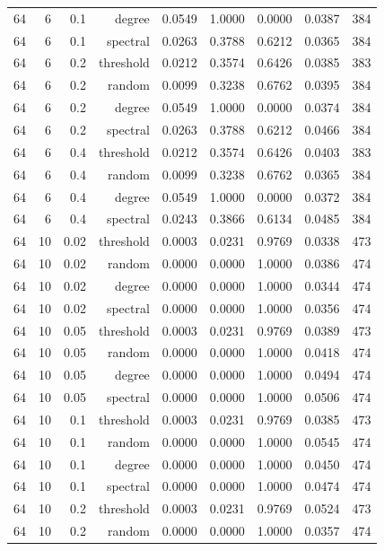 \begin{table}[t]
\begin{tabular}{lrrrrrrrr}
64 & 6 & 0.1 & degree & 0.0549 & 1.0000 & 0.0000 & 0.0387 & 384 \\
64 & 6 & 0.1 & spectral & 0.0263 & 0.3788 & 0.6212 & 0.0365 & 384 \\
64 & 6 & 0.2 & threshold & 0.0212 & 0.3574 & 0.6426 & 0.0385 & 383 \\
64 & 6 & 0.2 & random & 0.0099 & 0.3238 & 0.6762 & 0.0395 & 384 \\
64 & 6 & 0.2 & degree & 0.0549 & 1.0000 & 0.0000 & 0.0374 & 384 \\
64 & 6 & 0.2 & spectral & 0.0263 & 0.3788 & 0.6212 & 0.0466 & 384 \\
64 & 6 & 0.4 & threshold & 0.0212 & 0.3574 & 0.6426 & 0.0403 & 383 \\
64 & 6 & 0.4 & random & 0.0099 & 0.3238 & 0.6762 & 0.0365 & 384 \\
64 & 6 & 0.4 & degree & 0.0549 & 1.0000 & 0.0000 & 0.0372 & 384 \\
64 & 6 & 0.4 & spectral & 0.0243 & 0.3866 & 0.6134 & 0.0485 & 384 \\
64 & 10 & 0.02 & threshold & 0.0003 & 0.0231 & 0.9769 & 0.0338 & 473 \\
64 & 10 & 0.02 & random & 0.0000 & 0.0000 & 1.0000 & 0.0386 & 474 \\
64 & 10 & 0.02 & degree & 0.0000 & 0.0000 & 1.0000 & 0.0344 & 474 \\
64 & 10 & 0.02 & spectral & 0.0000 & 0.0000 & 1.0000 & 0.0356 & 474 \\
64 & 10 & 0.05 & threshold & 0.0003 & 0.0231 & 0.9769 & 0.0389 & 473 \\
64 & 10 & 0.05 & random & 0.0000 & 0.0000 & 1.0000 & 0.0418 & 474 \\
64 & 10 & 0.05 & degree & 0.0000 & 0.0000 & 1.0000 & 0.0494 & 474 \\
64 & 10 & 0.05 & spectral & 0.0000 & 0.0000 & 1.0000 & 0.0506 & 474 \\
64 & 10 & 0.1 & threshold & 0.0003 & 0.0231 & 0.9769 & 0.0385 & 473 \\
64 & 10 & 0.1 & random & 0.0000 & 0.0000 & 1.0000 & 0.0545 & 474 \\
64 & 10 & 0.1 & degree & 0.0000 & 0.0000 & 1.0000 & 0.0450 & 474 \\
64 & 10 & 0.1 & spectral & 0.0000 & 0.0000 & 1.0000 & 0.0474 & 474 \\
64 & 10 & 0.2 & threshold & 0.0003 & 0.0231 & 0.9769 & 0.0524 & 473 \\
64 & 10 & 0.2 & random & 0.0000 & 0.0000 & 1.0000 & 0.0357 & 474 \\

\end{tabular}
\end{table}
